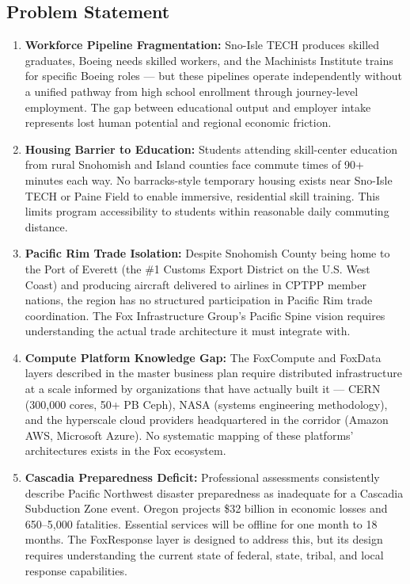 \documentclass[11pt,letterpaper]{article}
\begin{document}
\subsection{Problem Statement}

\begin{enumerate}[leftmargin=2em]
\item \textbf{Workforce Pipeline Fragmentation:} Sno-Isle TECH produces skilled graduates, Boeing needs skilled workers, and the Machinists Institute trains for specific Boeing roles --- but these pipelines operate independently without a unified pathway from high school enrollment through journey-level employment. The gap between educational output and employer intake represents lost human potential and regional economic friction.

\item \textbf{Housing Barrier to Education:} Students attending skill-center education from rural Snohomish and Island counties face commute times of 90+ minutes each way. No barracks-style temporary housing exists near Sno-Isle TECH or Paine Field to enable immersive, residential skill training. This limits program accessibility to students within reasonable daily commuting distance.

\item \textbf{Pacific Rim Trade Isolation:} Despite Snohomish County being home to the Port of Everett (the \#1 Customs Export District on the U.S. West Coast) and producing aircraft delivered to airlines in CPTPP member nations, the region has no structured participation in Pacific Rim trade coordination. The Fox Infrastructure Group's Pacific Spine vision requires understanding the actual trade architecture it must integrate with.

\item \textbf{Compute Platform Knowledge Gap:} The FoxCompute and FoxData layers described in the master business plan require distributed infrastructure at a scale informed by organizations that have actually built it --- CERN (300,000 cores, 50+ PB Ceph), NASA (systems engineering methodology), and the hyperscale cloud providers headquartered in the corridor (Amazon AWS, Microsoft Azure). No systematic mapping of these platforms' architectures exists in the Fox ecosystem.

\item \textbf{Cascadia Preparedness Deficit:} Professional assessments consistently describe Pacific Northwest disaster preparedness as inadequate for a Cascadia Subduction Zone event. Oregon projects \$32 billion in economic losses and 650--5,000 fatalities. Essential services will be offline for one month to 18 months. The FoxResponse layer is designed to address this, but its design requires understanding the current state of federal, state, tribal, and local response capabilities.
\end{enumerate}
\end{document}
